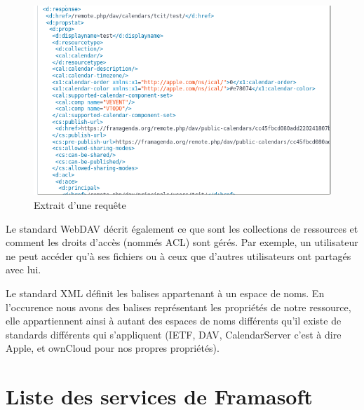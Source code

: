 \documentclass[10pt,a4paper, twoside]{report}
\begin{document}
	\begin{figure}[ht]
		\centering
		\includegraphics[width=1\textwidth]{images/requete-xml.png}
		\caption*{Extrait d'une requête}
		\label{normal_case}
	\end{figure}
	
	Le standard WebDAV décrit également ce que sont les collections de ressources et comment les droits d'accès (nommés ACL) sont gérés. Par exemple, un utilisateur ne peut accéder qu'à ses fichiers ou à ceux que d'autres utilisateurs ont partagés avec lui.
	
	Le standard XML définit les balises appartenant à un espace de noms. En l'occurence nous avons des balises représentant les propriétés de notre ressource, elle appartiennent ainsi à autant des espaces de noms différents qu'il existe de standards différents qui s'appliquent (IETF, DAV, CalendarServer c'est à dire Apple, et ownCloud pour nos propres propriétés).
	
	\section{Liste des services de Framasoft}
	\label{sec:listeservices}
	
\end{document}
